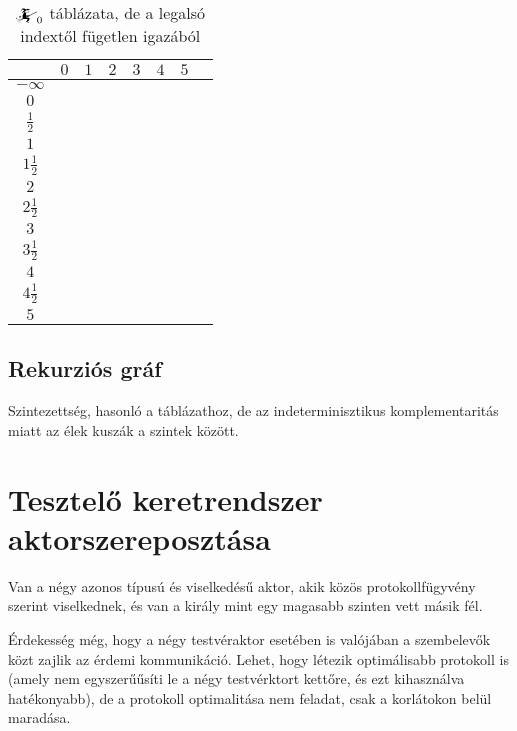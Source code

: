 \documentclass{article}
\newcommand{\nothing}{\text{\raisebox{0.4em}{\rotatebox{180}{$\curvearrowleft$}}}}%
\newcommand{\just}[1]{\boxed{#1}}%
\newcommand{\incl}{\mathbf{incl}}
\newcommand{\excl}{\mathbf{excl}}
\newcommand{\currymainfun}[1]{\mathwitch_{#1}}
\begin{document}
	\begin{table}[H]
		\caption*{$\currymainfun0$ táblázata, de a legalsó indextől fügetlen igazából}
		\centering
		\begin{tabular}{c||c|c|c|c|c|c|c|}
				&	$0$		&	$1$		&	$2$		&	$3$		&	$4$		&	$5$		\\\hline\hline
		$-\infty$	&	\nothing	&	\nothing	&	\nothing	&	\nothing	&	\nothing	&	\nothing	\\\hline
			$0$	&	\nothing	&	\nothing	&	\nothing	&	\nothing	&	\nothing	&	\just\incl	\\\hline
		$\frac12$	&	\just\excl	&	\nothing	&	\nothing	&	\nothing	&	\nothing	&	\just\incl	\\\hline
			$1$	&	\just\excl	&	\nothing	&	\nothing	&	\nothing	&	\just\incl	&			\\\hline
		$1\frac12$	&	\nothing	&	\nothing	&	\nothing	&	\nothing	&	\nothing	&	\nothing	\\\hline
			$2$	&	\nothing	&	\nothing	&	\nothing	&	\nothing	&	\nothing	&	\nothing	\\\hline
		$2\frac12$	&	\nothing	&	\nothing	&	\nothing	&	\nothing	&	\nothing	&	\nothing	\\\hline
			$3$	&	\nothing	&	\nothing	&	\nothing	&	\nothing	&	\nothing	&	\nothing	\\\hline
		$3\frac12$	&	\nothing	&	\nothing	&	\nothing	&	\nothing	&	\nothing	&	\nothing	\\\hline
			$4$	&	\nothing	&	\nothing	&	\nothing	&	\nothing	&	\nothing	&	\nothing	\\\hline
		$4\frac12$	&	\nothing	&	\nothing	&	\nothing	&	\nothing	&	\nothing	&	\nothing	\\\hline
			$5$	&	\nothing	&	\nothing	&	\nothing	&	\nothing	&	\nothing	&	\nothing	\\\hline
		\end{tabular}
	\end{table}

	\subsection{Rekurziós gráf}

	Szintezettség, hasonló a táblázathoz, de az indeterminisztikus komplementaritás miatt az élek kuszák a szintek között.

	\section{Tesztelő keretrendszer aktorszereposztása}

	Van a négy azonos típusú és viselkedésű aktor, akik közös protokollfügyvény szerint viselkednek, és van a király mint egy magasabb szinten vett másik fél.

	Érdekesség még, hogy a négy testvéraktor esetében is valójában a szembelevők közt zajlik az érdemi kommunikáció. Lehet, hogy létezik optimálisabb protokoll is (amely nem egyszerűűsíti le a négy testvérktort kettőre, és ezt kihasználva hatékonyabb), de a protokoll optimalitása nem feladat, csak a korlátokon belül maradása.
\end{document}
